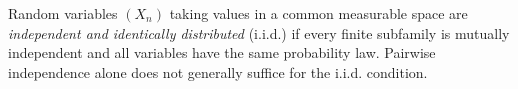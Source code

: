 
Random variables $(X_n)$ taking values in a common measurable space are \emph{independent and identically distributed} (i.i.d.) if every finite subfamily is mutually independent and all variables have the same probability law. Pairwise independence alone does not generally suffice for the i.i.d. condition.

